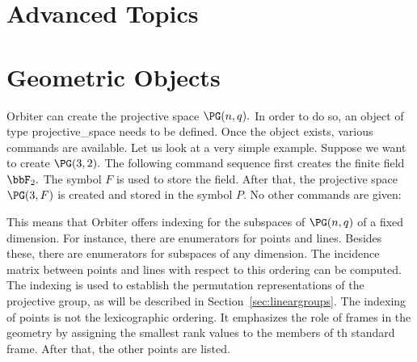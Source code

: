 



\bigskip

\clearpage


\section{Advanced Topics}
\label{sec:advanced:topics}






\bigskip

\clearpage


\section{Geometric Objects}
\label{sec:geometric:objects}






\bigskip

\clearpage

Orbiter can create the projective space $\PG(n,q).$ 
In order to do so, an object of type projective\_space needs to be defined. 
Once the object exists, various commands are available. 
Let us look at a very simple example. 
Suppose we want to create $\PG(3,2).$ 
The following command sequence first creates the finite field $\bbF_2.$
The symbol $F$ is used to store the field.
After that, the projective space $\PG(3,F)$ is created and stored in the symbol $P$.
No other commands are given:
{\tt

}

\bigskip





This means that Orbiter offers indexing for the subspaces of $\PG(n,q)$ of a fixed dimension. 
For instance, there are enumerators for points and lines. 
Besides these, there are enumerators for subspaces of any dimension.
The incidence matrix between points and lines with respect to this ordering can be 
computed. 
The indexing is used to establish the permutation representations of the projective group, 
as will be described in Section~\ref{sec:lineargroups}.
The indexing of points is not the lexicographic ordering. 
It emphasizes the role of frames in the geometry
by assigning the smallest rank values to the members of th standard frame. 
After that, the other points are listed. 

